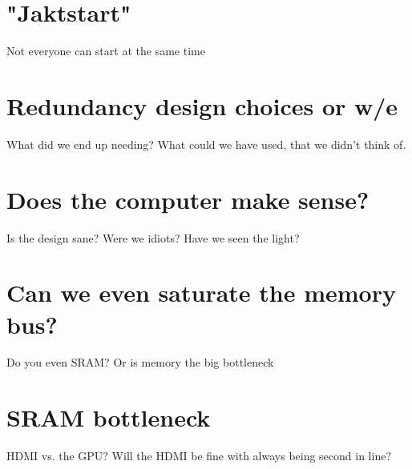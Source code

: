 \documentclass[../main/report.tex]{subfiles}
\begin{document}


\section{"Jaktstart"}

Not everyone can start at the same time

\section{Redundancy design choices or w/e}
What did we end up needing?
What could we have used, that we didn't think of.

\section{Does the computer make sense?}
Is the design sane?
Were we idiots?
Have we seen the light?

\section{Can we even saturate the memory bus?}
Do you even SRAM?
Or is memory the big bottleneck

\section{SRAM bottleneck}
HDMI vs. the GPU?
Will the HDMI be fine with always being second in line?


\end{document}
